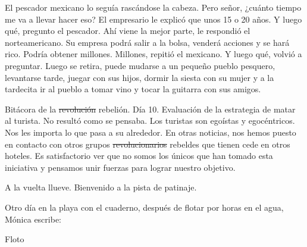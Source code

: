 \documentclass[12pt,twoside,openright,a5paper]{book}
\begin{document}
El pescador mexicano lo seguía rascándose la cabeza. Pero señor, ¿cuánto
tiempo me va a llevar hacer eso? El empresario le explicó que unos 15 o
20 años. Y luego qué, pregunto el pescador. Ahí viene la mejor parte,
le respondió el norteamericano. Su empresa podrá salir a la bolsa,
venderá acciones y se hará rico. Podría obtener millones. Millones,
repitió el mexicano. Y luego qué, volvió a preguntar. Luego se retira,
puede mudarse a un pequeño pueblo pesquero, levantarse tarde, juegar con
sus hijos, dormir la siesta con su mujer y a la tardecita ir al pueblo a
tomar vino y tocar la guitarra con sus amigos.


\vspace{0.5cm}
\hrulefill\hspace{0.2cm} \decofourleft\decofourright \hspace{0.2cm} \hrulefill
\vspace{0.5cm}

Bitácora de la \st{revolución} rebelión. Día 10. Evaluación de la estrategia de
matar al turista. No resultó como se pensaba. Los turistas son egoístas y
egocéntricos. Nos les importa lo que pasa a su alrededor. En otras noticias,
nos hemos puesto en contacto con otros grupos \st{revolucionarios}
rebeldes que tienen
cede en otros hoteles. Es satisfactorio ver que no somos los únicos que han
tomado esta iniciativa y pensamos unir fuerzas para lograr nuestro objetivo.



\vspace{0.5cm}
\hrulefill\hspace{0.2cm} \decofourleft\decofourright \hspace{0.2cm} \hrulefill
\vspace{0.5cm}

A la vuelta llueve. Bienvenido a la pista de patinaje.


\vspace{0.5cm}
\hrulefill\hspace{0.2cm} \decofourleft\decofourright \hspace{0.2cm} \hrulefill
\vspace{0.5cm}

Otro día en la playa con el cuaderno, después de
flotar por horas en el agua, Mónica escribe:

\vspace{0.5cm}

Floto
\end{document}
